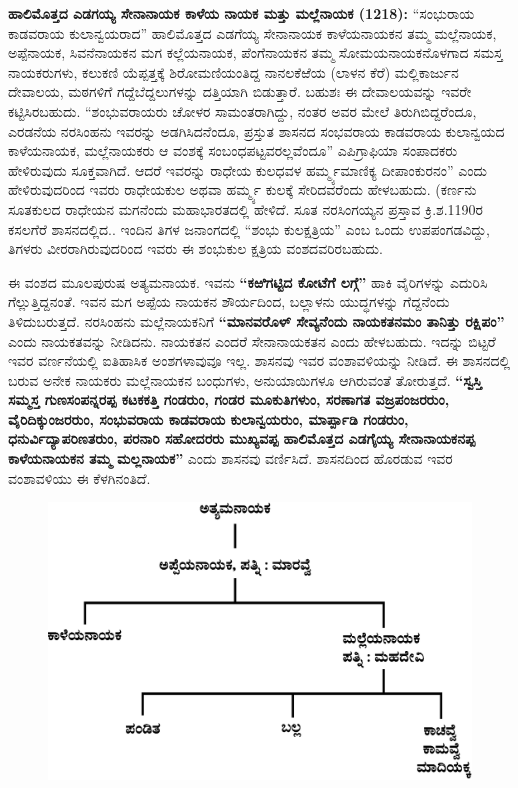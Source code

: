 \textbf{ಹಾಲಿಮೊತ್ತದ ಎಡಗಯ್ಯ ಸೇನಾನಾಯಕ ಕಾಳೆಯ ನಾಯಕ ಮತ್ತು ಮಲ್ಲೆನಾಯಕ (1218):} “ಸಂಭುರಾಯ ಕಾಡವರಾಯ ಕುಲಾನ್ವಯರಾದ” ಹಾಲಿಮೊತ್ತದ ಎಡಗೆಯ್ಯ ಸೇನಾನಾಯಕ ಕಾಳೆಯನಾಯಕನ ತಮ್ಮ ಮಲ್ಲೆನಾಯಕ, ಅಪ್ಪೆನಾಯಕ, ಸಿವನೆನಾಯಕನ ಮಗ ಕಲ್ಲೆಯನಾಯಕ, ಪೆಂಗೆನಾಯಕನ ತಮ್ಮ ಸೋಮಯನಾಯಕನೊಳಗಾದ ಸಮಸ್ತ ನಾಯಕರುಗಳು, ಕಲುಕಣಿ ಯೆಪ್ಪತ್ತಕ್ಕೆ ಶಿರೋಮಣಿಯಂತಿದ್ದ ನಾನಲಕೆಱೆಯ (ಲಾಳನ ಕೆರೆ) ಮಲ್ಲಿಕಾರ್ಜುನ ದೇವಾಲಯ, ಮಠಗಳಿಗೆ ಗದ್ದೆಬೆದ್ದಲುಗಳನ್ನು ದತ್ತಿಯಾಗಿ ಬಿಡುತ್ತಾರೆ. ಬಹುಶಃ ಈ ದೇವಾಲಯವನ್ನು ಇವರೇ ಕಟ್ಟಿಸಿರಬಹುದು. “ಶಂಭುವರಾಯರು ಚೋಳರ ಸಾಮಂತರಾಗಿದ್ದು, ನಂತರ ಅವರ ಮೇಲೆ ತಿರುಗಿಬಿದ್ದರೆಂದೂ, ಎರಡನೆಯ ನರಸಿಂಹನು ಇವರನ್ನು ಅಡಗಿಸಿದನೆಂದೂ, ಪ್ರಸ್ತುತ ಶಾಸನದ ಸಂಭವರಾಯ ಕಾಡವರಾಯ ಕುಲಾನ್ವಯದ ಕಾಳೆಯನಾಯಕ, ಮಲ್ಲೆನಾಯಕರು ಆ ವಂಶಕ್ಕೆ ಸಂಬಂಧಪಟ್ಟವ\-ರಲ್ಲವೆಂದೂ” ಎಪಿಗ್ರಾಫಿಯಾ ಸಂಪಾದಕರು ಹೇಳಿರುವುದು ಸೂಕ್ತವಾಗಿದೆ. ಆದರೆ ಇವರನ್ನು ರಾಧೇಯ ಕುಲಧವಳ ಹರ್ಮ್ಮ್ಯಮಾಣಿಕ್ಯ ದೀಪಾಂಕುರನಂ” ಎಂದು ಹೇಳಿರುವುದರಿಂದ ಇವರು ರಾಧೇಯಕುಲ ಅಥವಾ ಹರ್ಮ್ಮ್ಯ ಕುಲಕ್ಕೆ ಸೇರಿದವ\-ರೆಂದು ಹೇಳಬಹುದು. (ಕರ್ಣನು ಸೂತಕುಲದ ರಾಧೇಯನ ಮಗನೆಂದು ಮಹಾಭಾರತದಲ್ಲಿ ಹೇಳಿದೆ. ಸೂತ ನರಸಿಂಗಯ್ಯನ ಪ್ರಸ್ತಾವ ಕ್ರಿ.ಶ.1190ರ ಕಸಲಗೆರೆ ಶಾಸನದಲ್ಲಿದ.. ಇಂದಿನ ತಿಗಳ ಜನಾಂಗದಲ್ಲಿ “ಶಂಭು ಕುಲಕ್ಷತ್ರಿಯ” ಎಂಬ ಒಂದು ಉಪಪಂಗಡವಿದ್ದು, ತಿಗಳರು ವೀರರಾಗಿರುವುದರಿಂದ ಇವರು ಈ ಶಂಭುಕುಲ ಕ್ಷತ್ರಿಯ ವಂಶದವರಿರಬಹುದು.

ಈ ವಂಶದ ಮೂಲಪುರುಷ ಅತ್ಯಮನಾಯಕ. ಇವನು \textbf{“ಕಱಿಗಟ್ಟಿದ ಕೋಟೆಗೆ ಲಗ್ಗೆ”} ಹಾಕಿ ವೈರಿಗಳನ್ನು ಎದುರಿಸಿ ಗೆಲ್ಲುತ್ತಿದ್ದನಂತೆ. ಇವನ ಮಗ ಅಪ್ಪೆಯ ನಾಯಕನ ಶೌರ್ಯದಿಂದ, ಬಲ್ಲಾಳನು ಯುದ್ಧಗಳನ್ನು ಗೆದ್ದನೆಂದು ತಿಳಿದುಬರುತ್ತದೆ. ನರಸಿಂಹನು ಮಲ್ಲೆನಾಯಕನಿಗೆ \textbf{“ಮಾನವರೊಳ್​ ಸೇವ್ಯನೆಂದು ನಾಯಕತನಮಂ ತಾನಿತ್ತು ರಕ್ಷಿಪಂ”} ಎಂದು ನಾಯಕತವನ್ನು ನೀಡಿದನು. ನಾಯಕತನ ಎಂದರೆ ಸೇನಾನಾಯಕತನ ಎಂದು ಹೇಳಬಹುದು. ಇದನ್ನು ಬಿಟ್ಟರೆ ಇವರ ವರ್ಣನೆಯಲ್ಲಿ ಐತಿಹಾಸಿಕ ಅಂಶಗಳಾವುವೂ ಇಲ್ಲ. ಶಾಸನವು ಇವರ ವಂಶಾವಳಿಯನ್ನು ನೀಡಿದೆ. ಈ ಶಾಸನದಲ್ಲಿ ಬರುವ ಅನೇಕ ನಾಯಕರು ಮಲ್ಲೆನಾಯಕನ ಬಂಧುಗಳು, ಅನುಯಾಯಿಗಳೂ ಆಗಿರುವಂತೆ ತೋರುತ್ತದೆ. \textbf{“ಸ್ವಸ್ತಿ ಸಮ್ಮಸ್ತ ಗುಣಸಂಪನ್ನರಪ್ಪ ಕಟಕಕತ್ತಿ ಗಂಡರುಂ, ಗಂಡರ ಮೂಕುತಿಗಳುಂ, ಸರಣಾಗತ ವಜ್ರಪಂಜರರುಂ, ವೈರಿದಿಕ್ಕುಂಜರರುಂ, ಸಂಭುವರಾಯ ಕಾಡವರಾಯ ಕುಲಾನ್ವಯರುಂ, ಮಾರ್ಪ್ಪಾಡಿ ಗಂಡರುಂ, ಧನುರ್ವಿದ್ಯಾಪರಿಣತರುಂ, ಪರನಾರಿ ಸಹೋದರರು ಮುಖ್ಯವಪ್ಪ ಹಾಲಿಮೊತ್ತದ ಎಡಗೈಯ್ಯ ಸೇನಾನಾಯಕನಪ್ಪ ಕಾಳೆಯನಾಯಕನ ತಮ್ಮ ಮಲ್ಲನಾಯಕ”} ಎಂದು ಶಾಸನವು ವರ್ಣಿಸಿದೆ. ಶಾಸನದಿಂದ ಹೊರಡುವ ಇವರ ವಂಶಾವಳಿಯು ಈ ಕೆಳಗಿನಂತಿದೆ.

\begin{figure}[H]
\includegraphics[scale=1.2]{images/chap3/chap3fig29.jpeg}
\end{figure}

